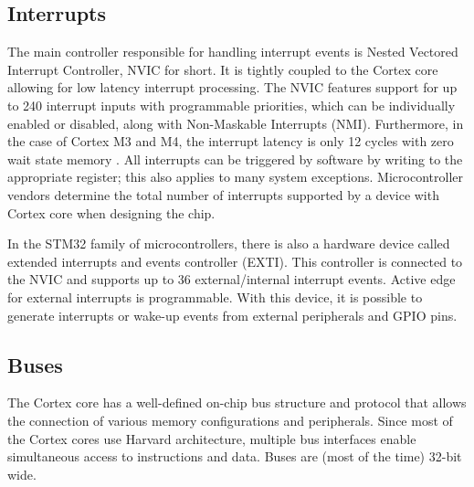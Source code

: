 	\subsection{Interrupts}
	\label{sub:nvic}
The main controller responsible for handling interrupt events is Nested Vectored Interrupt Controller, NVIC for short. It is tightly coupled to the Cortex core allowing for low latency interrupt processing. The NVIC features support for up to 240 interrupt inputs with programmable priorities, which can be individually enabled or disabled, along with Non-Maskable Interrupts (NMI). Furthermore, in the case of Cortex M3 and M4, the interrupt latency is only 12 cycles with zero wait state memory \cite{yu}. All interrupts can be triggered by software by writing to the appropriate register; this also applies to many system exceptions. Microcontroller vendors determine the total number of interrupts supported by a device with Cortex core when designing the chip.

In the  STM32 family of microcontrollers, there is also a hardware device called extended interrupts and events controller (EXTI). This controller is connected to the NVIC and supports up to 36 external/internal interrupt events. Active edge for external interrupts is programmable. With this device, it is possible to generate interrupts or wake-up events from external peripherals and GPIO pins.

	\subsection{Buses}
	\label{sub:buses}
The Cortex core has a well-defined on-chip bus structure and protocol that allows the connection of various memory configurations and peripherals. Since most of the Cortex cores use Harvard architecture, multiple bus interfaces enable simultaneous access to instructions and data. Buses are (most of the time) 32-bit wide.

